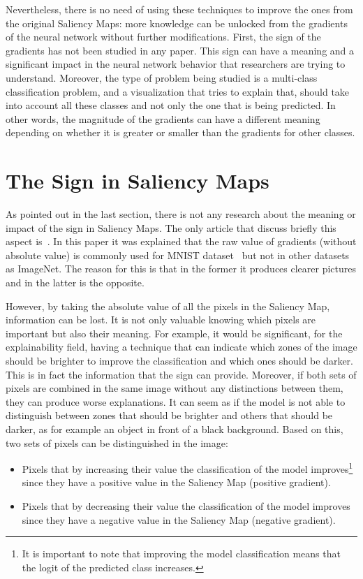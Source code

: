 \documentclass[preprint,12pt]{elsarticle}
\begin{document}
Nevertheless, there is no need of using these techniques to improve the ones from the original Saliency Maps: more knowledge can be unlocked from the gradients of the neural network without further modifications. First, the sign of the gradients has not been studied in any paper. This sign can have a meaning and a significant impact in the neural network behavior that researchers are trying to understand. Moreover, the type of problem being studied is a multi-class classification problem, and a visualization that tries to explain that, should take into account all these classes and not only the one that is being predicted. In other words, the magnitude of the gradients can have a different meaning depending on whether it is greater or smaller than the gradients for other classes. 

\section{The Sign in Saliency Maps}
\label{sec:the sign in saliency maps}
As pointed out in the last section, there is not any research about the meaning or impact of the sign in Saliency Maps. The only article that discuss briefly this aspect is~\cite{smilkovSmoothGradRemovingNoise}. In this paper it was explained that the raw value of gradients (without absolute value) is commonly used for MNIST dataset~\cite{MNISTHandwrittenDigit} but not in other datasets as ImageNet. The reason for this is that in the former it produces clearer pictures and in the latter is the opposite. 

However, by taking the absolute value of all the pixels in the Saliency Map, information can be lost. It is not only valuable knowing which pixels are important but also their meaning. For example, it would be significant, for the explainability field, having a technique that can indicate which zones of the image should be brighter to improve the classification and which ones should be darker. This is in fact the information that the sign can provide. Moreover, if both sets of pixels are combined in the same image without any distinctions between them, they can produce worse explanations. It can seem as if the model is not able to distinguish between zones that should be brighter and others that should be darker, as for example an object in front of a black background. Based on this, two sets of pixels can be distinguished in the image:

\begin{itemize}
    \item Pixels that by increasing their value the classification of the model improves\footnote{It is important to note that improving the model classification means that the logit of the predicted class increases. } since they have a positive value in the Saliency Map (positive gradient).
    \item Pixels that by decreasing their value the classification of the model improves since they have a negative value in the Saliency Map (negative gradient).
\end{itemize}
\end{document}
